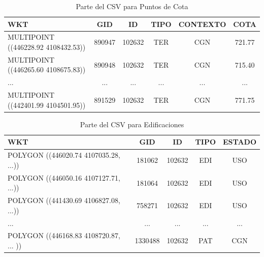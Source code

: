 \begin{table}[H]
	\centering
	\caption{Parte del CSV para Puntos de Cota}
	\label{csv-puntos}
	\begin{tabular}{|m{3cm}|c|c|c|c|c|}
		\hline
		\rowcolor[HTML]{EFEFEF} 
		\textbf{WKT}                        & \textbf{GID} & \textbf{ID} & \textbf{TIPO} & \textbf{CONTEXTO} & \textbf{COTA} \\ \hline
		MULTIPOINT ((446228.92 4108432.53)) & 890947       & 102632            & TER           & CGN               & 721.77        \\ \hline
		MULTIPOINT ((446265.60 4108675.83))  & 890948       & 102632            & TER           & CGN               & 715.40        \\ \hline
		...  & ...       & ...            & ...           & ...               &...        \\ \hline
		MULTIPOINT ((442401.99 4104501.95)) & 891529       & 102632            & TER           & CGN               & 771.75        \\ \hline
	\end{tabular}
\end{table}


\begin{table}[H]
	\centering
	\caption{Parte del CSV para Edificaciones}
	\label{csv-poligonos}
	\begin{tabular}{|m{4cm}|c|c|c|c|}
		\hline
		\rowcolor[HTML]{EFEFEF} 
		\textbf{WKT}                        & \textbf{GID} & \textbf{ID} & \textbf{TIPO} & \textbf{ESTADO} \\ \hline
		POLYGON ((446020.74 4107035.28, ...)) & 181062       & 102632            & EDI           & USO                       \\ \hline
		POLYGON ((446050.16 4107127.71, ...))  & 181064       & 102632            & EDI           & USO                  \\ \hline
		POLYGON ((441430.69 4106827.08, ...)) & 758271       & 102632            & EDI           & USO                     \\ \hline
		...  & ...       & ...            & ...           & ...                     \\ \hline
		POLYGON ((446168.83 4108720.87, ... )) & 1330488       & 102632            & PAT           & CGN                    \\ \hline
	\end{tabular}
\end{table}




